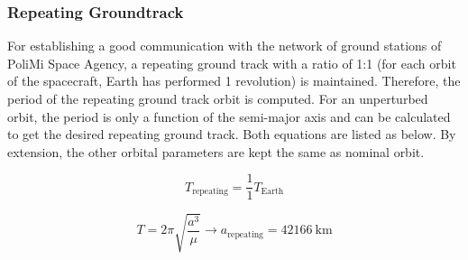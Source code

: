 \documentclass{article}
\begin{document}

\subsubsection{Repeating Groundtrack}


For establishing a good communication with the network of ground stations of PoliMi Space Agency, a repeating ground track with a ratio of 1:1 (for each orbit of the spacecraft, Earth has performed 1 revolution) is maintained. Therefore, the period of the repeating ground track orbit is computed. For an unperturbed orbit, the period is only a function of the semi-major axis and can be calculated to get the desired repeating ground track. Both equations are listed as below. By extension, the other orbital parameters are kept the same as nominal orbit. 

	
\begin{equation*}
	T_{\text{repeating}} = \frac{1}{1} T_{\text{Earth}}
\end{equation*}

\begin{equation*}
	T = 2\pi \sqrt{\frac{a^3}{\mu}} \rightarrow a_{\text{repeating}} = \SI{42166}{\kilo\meter}
\end{equation*} 
\end{document}
